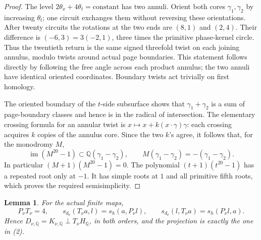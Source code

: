 \documentclass[11pt]{article}
\newtheorem{lemma}[theorem]{Lemma}
\newcommand{\Q}{\mathbb Q}
\begin{document}
\begin{proof}
The level \(2\theta_x+4\theta_t=\mathrm{constant}\) has two annuli.
Orient both cores \(\gamma_1,\gamma_2\) by increasing \(\theta_t\);
one circuit exchanges them without reversing these orientations.
After twenty circuits the rotations at the two ends are
\((8,1)\) and \((2,4)\). Their difference is
\((-6,3)=3(-2,1)\), three times the primitive phase-kernel circle.
Thus the twentieth return is the same signed threefold twist on
each joining annulus, modulo twists around actual page boundaries.
This statement follows directly by following the free angle across
each product annulus; the two annuli have identical oriented
coordinates. Boundary twists act trivially on first homology.

The oriented boundary of the \(t\)-side subsurface shows that
\(\gamma_1+\gamma_2\) is a sum of page-boundary classes and hence
is in the radical of intersection. The elementary crossing formula
for an annular twist is \(x\mapsto x+k(x\cdot\gamma)\gamma\):
each crossing acquires \(k\) copies of the annulus core.
Since the two \(k\)'s agree, it follows that, for the monodromy \(M\),
\[
 \operatorname{im}(M^{20}-1)\subset
   \Q(\gamma_1-\gamma_2),\qquad
 M(\gamma_1-\gamma_2)=-(\gamma_1-\gamma_2).
                                                               \tag{5}
\]
In particular \((M+1)(M^{20}-1)=0\).
The polynomial \((t+1)(t^{20}-1)\) has a repeated root only at
\(-1\). It has simple roots at \(1\) and all primitive fifth roots,
which proves the required semisimplicity.
\end{proof}

\begin{lemma}\label{lem:adjunction}
For the actual finite maps,
\[
 P_\nu T_\nu=4,\qquad
 s_{d_\nu}(T_\nu a,l)=s_h(a,P_\nu l),\qquad
 s_{d_\nu}(l,T_\nu a)=s_h(P_\nu l,a).              \tag{6}
\]
Hence \(D_{\nu,\Q}=K_{\nu,\Q}\perp T_\nu H_\Q\), in both
orders, and the projection is exactly the one in (2).
\end{lemma}
\end{document}
